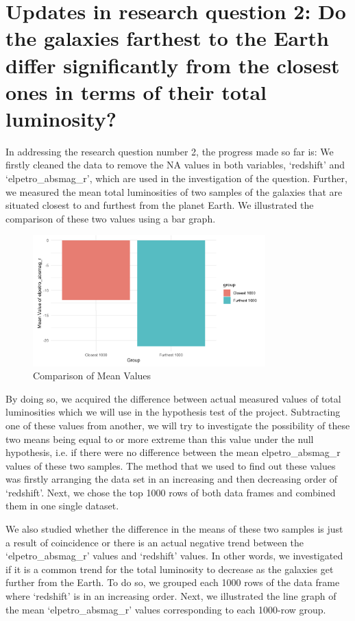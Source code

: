 \documentclass[12pt]{article}
\begin{document}
\newpage 
\mbox{}
\newpage

\section{Updates in research question 2: Do the galaxies farthest to the Earth differ significantly from the closest ones in terms of their total luminosity?}

In addressing the research question number 2, the progress made so far is: We firstly cleaned the data to remove the NA values in both variables, `redshift' and `elpetro\_absmag\_r', which are used in the investigation of the question. Further, we measured the mean total luminosities of two samples of the galaxies that are situated closest to and furthest from the planet Earth. We illustrated the comparison of these two values using a bar graph.

\begin{figure}[h]
	\centering
	\includegraphics[width=0.8\textwidth]{Graphs/3.png}
	\caption{Comparison of Mean Values}
\end{figure}

By doing so, we acquired the difference between actual measured values of total luminosities which we will use in the hypothesis test of the project. Subtracting one of these values from another, we will try to investigate the possibility of these two means being equal to or more extreme than this value under the null hypothesis, i.e. if there were no difference between the mean elpetro\_absmag\_r values of these two samples. The method that we used to find out these values was firstly arranging the data set in an increasing and then decreasing order of `redshift'. Next, we chose the top 1000 rows of both data frames and combined them in one single dataset. 

We also studied whether the difference in the means of these two samples is just a result of coincidence or there is an actual negative trend between the `elpetro\_absmag\_r' values and `redshift' values. In other words, we investigated if it is a common trend for the total luminosity to decrease as the galaxies get further from the Earth. To do so, we grouped each 1000 rows of the data frame where `redshift' is in an increasing order. Next, we illustrated the line graph of the mean `elpetro\_absmag\_r' values corresponding to each 1000-row group. 
\end{document}
